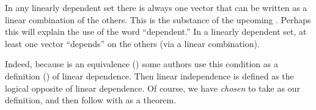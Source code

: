 %
\begin{introduction}
\begin{para}In any linearly dependent set there is always one vector that can be written as a linear combination of the others.  This is the substance of the upcoming .  Perhaps this will explain the use of the word ``dependent.''  In a linearly dependent set, at least one vector ``depends'' on the others (via a linear combination).\end{para}
%
\begin{para}Indeed, because  is an equivalence () some authors use this condition as a definition () of linear dependence.  Then linear independence is defined as the logical opposite of linear dependence.  Of course, we have {\em chosen} to take  as our definition, and then follow with  as a theorem.\end{para}
\end{introduction}
%

